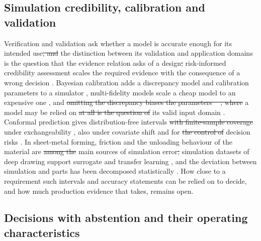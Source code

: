 \documentclass[pdflatex,sn-basic,lineno]{sn-jnl}
\providecommand{\DIFadd}[1]{{\protect\color{blue}\uwave{#1}}} %
\providecommand{\DIFdel}[1]{{\protect\color{red}\sout{#1}}}                      %
\providecommand{\DIFaddbegin}{} %
\providecommand{\DIFaddend}{} %
\providecommand{\DIFdelbegin}{} %
\providecommand{\DIFdelend}{} %
\newcommand{\DIFscaledelfig}{0.5}
\newlength{\DIFdelgraphicswidth} %
\newlength{\DIFdelgraphicsheight} %
\newcommand{\DIFaddincludegraphics}[2][]{{\color{blue}\fbox{\DIFOincludegraphics[#1]{#2}}}} %
\newcommand{\DIFdelincludegraphics}[2][]{%
\sbox{\DIFdelgraphicsbox}{\DIFOincludegraphics[#1]{#2}}%
\settoboxwidth{\DIFdelgraphicswidth}{\DIFdelgraphicsbox} %
\settoboxtotalheight{\DIFdelgraphicsheight}{\DIFdelgraphicsbox} %
\scalebox{\DIFscaledelfig}{%
\parbox[b]{\DIFdelgraphicswidth}{\usebox{\DIFdelgraphicsbox}\\[-\baselineskip] \rule{\DIFdelgraphicswidth}{0em}}\llap{\resizebox{\DIFdelgraphicswidth}{\DIFdelgraphicsheight}{%
\setlength{\unitlength}{\DIFdelgraphicswidth}%
\begin{picture}(1,1)%
\thicklines\linethickness{2pt} %
{\color[rgb]{1,0,0}\put(0,0){\framebox(1,1){}}}%
{\color[rgb]{1,0,0}\put(0,0){\line( 1,1){1}}}%
{\color[rgb]{1,0,0}\put(0,1){\line(1,-1){1}}}%
\end{picture}%
}\hspace*{3pt}}} %
} %
\DeclareRobustCommand{\DIFaddbegin}{\DIFOaddbegin \let\includegraphics\DIFaddincludegraphics} %
\DeclareRobustCommand{\DIFaddend}{\DIFOaddend \let\includegraphics\DIFOincludegraphics} %
\DeclareRobustCommand{\DIFdelbegin}{\DIFOdelbegin \let\includegraphics\DIFdelincludegraphics} %
\DeclareRobustCommand{\DIFdelend}{\DIFOaddend \let\includegraphics\DIFOincludegraphics} %
\begin{document}
\subsection{Simulation credibility, calibration and validation}

Verification and validation ask whether a model is accurate enough for its intended use\DIFdelbegin \DIFdel{, and }\DIFdelend \DIFaddbegin \DIFadd{; }\DIFaddend the distinction between its validation and application domains \citep{oberkampf2010verification} is the question that the evidence relation asks of a design\DIFdelbegin \DIFdel{; }\DIFdelend \DIFaddbegin \DIFadd{, and }\DIFaddend risk-informed credibility assessment scales the required evidence with the consequence of a wrong decision \citep{asme2018assessing}. Bayesian calibration adds a discrepancy model and calibration parameters to a simulator \citep{kennedy2001bayesian}, multi-fidelity models scale a cheap model to an expensive one \citep{kennedy2000predicting}, and \DIFdelbegin \DIFdel{omitting the discrepancy biases the parameters \mbox{%
\citep{brynjarsdottir2014learning}}\hskip0pt%
; where }\DIFdelend a model may be relied on \DIFdelbegin \DIFdel{at all is the question of }\DIFdelend \DIFaddbegin \DIFadd{only within }\DIFaddend its valid input domain \citep{malak2010using}. Conformal prediction gives distribution-free intervals \DIFdelbegin \DIFdel{with finite-sample coverage }\DIFdelend under exchangeability \citep{lei2018distribution, barber2021predictive}, also under covariate shift \citep{tibshirani2019conformal} and for \DIFdelbegin \DIFdel{the control of }\DIFdelend decision risks \citep{angelopoulos2024conformal}. In sheet-metal forming, friction \citep{hol2012advanced} and the unloading behaviour of the material \citep{yoshida2002model} are \DIFdelbegin \DIFdel{among the }\DIFdelend main sources of simulation error\DIFdelbegin \DIFdel{; }\DIFdelend \DIFaddbegin \DIFadd{, }\DIFaddend simulation datasets of deep drawing support surrogate and transfer learning \citep{baum2025ddacs, heinzelmann2025comprehensive}, and the deviation between simulation and parts has been decomposed statistically \citep{baum2026statistical}. How close to a requirement such intervals and accuracy statements can be relied on to decide, and how much production evidence that takes, remains open.

\subsection{Decisions with abstention and their operating characteristics}
\end{document}
